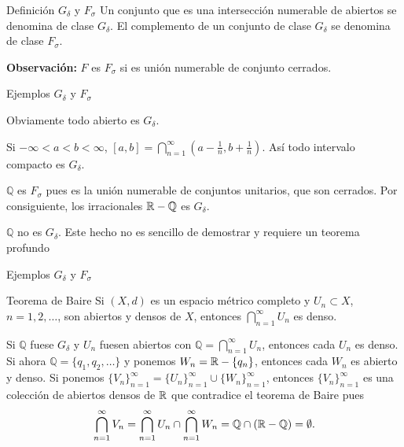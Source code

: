 {Definición  $G_{\delta}$ y $F_{\sigma}$}
 Un conjunto que es una intersección numerable de abiertos se denomina de clase $G_{\delta}$. El complemento de un conjunto de clase  $G_{\delta}$ se denomina de clase $F_{\sigma}$. 
 

\textbf{Observación:} $F$ es $F_{\sigma}$ si es unión  numerable de conjunto cerrados.






Ejemplos $G_{\delta}$ y $F_{\sigma}$
\begin{ejemplo}{}
  Obviamente todo abierto es $G_{\delta}$.
 \end{ejemplo}
 \begin{ejemplo}{}
   Si $-\infty<a<b<\infty$, $[a,b]=\bigcap_{n=1}^{\infty}(a-\frac{1}{n},b+\frac{1}{n})$. Así todo intervalo compacto es $G_{\delta}$.
   
  \end{ejemplo}
  
   \begin{ejemplo}{}
     $\mathbb{Q}$ es $F_{\sigma}$ pues es la unión numerable de conjuntos unitarios, que son cerrados. Por consiguiente, los irracionales $\mathbb{R}-\mathbb{Q}$ es $G_{\delta}$. 
    \end{ejemplo}


      \begin{ejemplo}{}
     $\mathbb{Q}$ no es $G_{\delta}$. Este hecho no es sencillo de demostrar y requiere un teorema profundo
    \end{ejemplo} 
    

Ejemplos $G_{\delta}$ y $F_{\sigma}$
    



{Teorema de Baire}
 Si $(X,d)$ es un espacio métrico completo y $U_n\subset X$, $n=1,2,\ldots$, son abiertos y densos de $X$, entonces $\bigcap_{n=1}^{\infty}U_n$ es denso.  


Si $\mathbb{Q}$ fuese  $G_{\delta}$ y $U_n$ fuesen abiertos con $\mathbb{Q}=\bigcap_{n=1}^{\infty}U_n$, entonces cada $U_n$ es denso. Si ahora $\mathbb{Q}=\{q_1,q_2,\ldots\}$ y  ponemos $W_n=\mathbb{R}-\{q_n\}$, entonces cada $W_n$ es abierto y denso. Si ponemos $\{V_n\}_{n=1}^{\infty}=\{U_n\}_{n=1}^{\infty}\cup \{W_n\}_{n=1}^{\infty}$, entonces 
 $\{V_n\}_{n=1}^{\infty}$ es una colección de abiertos densos de $\mathbb{R}$ que contradice el teorema de Baire pues
 \[\bigcap_{n=1}^{\infty}V_n=\bigcap_{n=1}^{\infty}U_n\cap \bigcap_{n=1}^{\infty}W_n=\mathbb{Q}\cap(\mathbb{R}-\mathbb{Q})=\emptyset.\]



